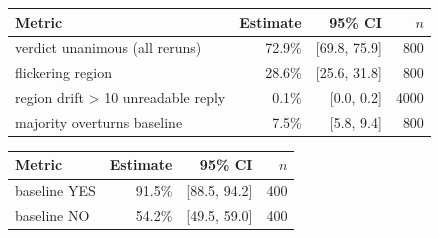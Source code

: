 \begin{tabular}{lrrr}
\toprule
Metric & Estimate & 95\% CI & $n$ \\
\midrule
verdict unanimous (all reruns) & 72.9\% & [69.8, 75.9] & 800 \\
flickering region & 28.6\% & [25.6, 31.8] & 800 \\
region drift > 10%
unreadable reply & 0.1\% & [0.0, 0.2] & 4000 \\
majority overturns baseline & 7.5\% & [5.8, 9.4] & 800 \\
\bottomrule
\end{tabular}

\begin{tabular}{lrrr}
\toprule
Metric & Estimate & 95\% CI & $n$ \\
\midrule
baseline YES & 91.5\% & [88.5, 94.2] & 400 \\
baseline NO & 54.2\% & [49.5, 59.0] & 400 \\
\bottomrule
\end{tabular}

